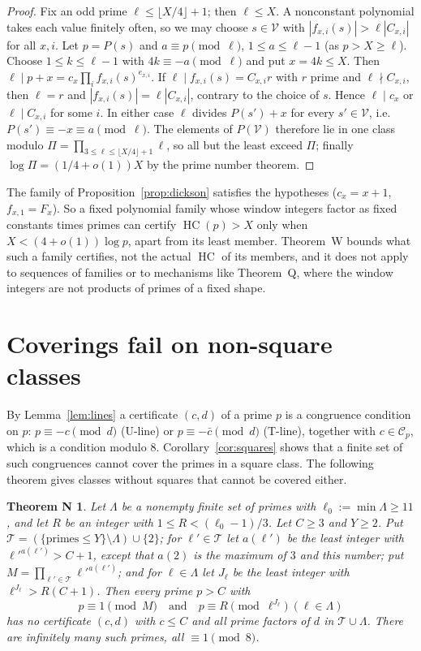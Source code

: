 \documentclass[11pt,reqno]{amsart}
\newtheorem*{thmN}{Theorem N}
\theoremstyle{definition}
\newcommand{\cC}{\mathcal C}
\newcommand{\cT}{\mathcal T}
\newcommand{\HC}{\operatorname{HC}}
\begin{document}
\begin{proof}
Fix an odd prime $\ell\le\lfloor X/4\rfloor+1$; then $\ell\le X$.  A
nonconstant polynomial takes each value finitely often, so we may choose
$s\in\mathcal V$ with $|f_{x,i}(s)|>\ell|C_{x,i}|$ for all $x,i$.  Let
$p=P(s)$ and $a\equiv p\pmod\ell$, $1\le a\le\ell-1$ (as $p>X\ge\ell$).
Choose $1\le k\le\ell-1$ with $4k\equiv-a\pmod\ell$ and put $x=4k\le X$.
Then $\ell\mid p+x=c_x\prod_if_{x,i}(s)^{e_{x,i}}$.  If $\ell\mid
f_{x,i}(s)=C_{x,i}r$ with $r$ prime and $\ell\nmid C_{x,i}$, then $\ell=r$
and $|f_{x,i}(s)|=\ell|C_{x,i}|$, contrary to the choice of $s$.  Hence
$\ell\mid c_x$ or $\ell\mid C_{x,i}$ for some $i$.  In either case $\ell$
divides $P(s')+x$ for every $s'\in\mathcal V$, i.e.\ $P(s')\equiv-x\equiv
a\pmod\ell$.  The elements of $P(\mathcal V)$ therefore lie in one class
modulo $\Pi=\prod_{3\le\ell\le\lfloor X/4\rfloor+1}\ell$, so all but the
least exceed $\Pi$; finally $\log\Pi=(1/4+o(1))X$ by the prime number
theorem.
\end{proof}

The family of Proposition~\ref{prop:dickson} satisfies the hypotheses
($c_x=x+1$, $f_{x,1}=F_x$).  So a fixed polynomial family whose window
integers factor as fixed constants times primes can certify $\HC(p)>X$
only when $X<(4+o(1))\log p$, apart from its least member.  Theorem~W
bounds what such a family certifies, not the actual $\HC$ of its members,
and it does not apply to sequences of families or to mechanisms like
Theorem~Q, where the window integers are not products of primes of a
fixed shape.

\section{Coverings fail on non-square classes}\label{sec:cover}

By Lemma~\ref{lem:lines} a certificate $(c,d)$ of a prime $p$ is a
congruence condition on $p$: $p\equiv-c\pmod d$ (U-line) or
$p\equiv-\bar c\pmod d$ (T-line), together with $c\in\cC_p$, which is a
condition modulo $8$.  Corollary~\ref{cor:squares} shows that a finite set
of such congruences cannot cover the primes in a square class.  The
following theorem gives classes without squares that cannot be covered
either.

\begin{thmN}
Let $\Lambda$ be a nonempty finite set of primes with
$\ell_0:=\min\Lambda\ge11$, and let $R$ be an integer with
$1\le R<(\ell_0-1)/3$.  Let $C\ge3$ and $Y\ge2$.  Put
$\cT=(\{\text{primes}\le Y\}\setminus\Lambda)\cup\{2\}$; for
$\ell'\in\cT$ let $a(\ell')$ be the least integer with
$\ell'^{a(\ell')}>C+1$, except that $a(2)$ is the maximum of $3$ and this
number; put $M=\prod_{\ell'\in\cT}\ell'^{a(\ell')}$; and for $\ell\in\Lambda$
let $J_\ell$ be the least integer with $\ell^{J_\ell}>R(C+1)$.  Then every
prime $p>C$ with
\[
p\equiv1\pmod M\quad\text{and}\quad p\equiv R\pmod{\ell^{J_\ell}}\ (\ell\in\Lambda)
\]
has no certificate $(c,d)$ with $c\le C$ and all prime factors of $d$ in
$\cT\cup\Lambda$.  There are infinitely many such primes, all
$\equiv1\pmod8$.
\end{thmN}
\end{document}
